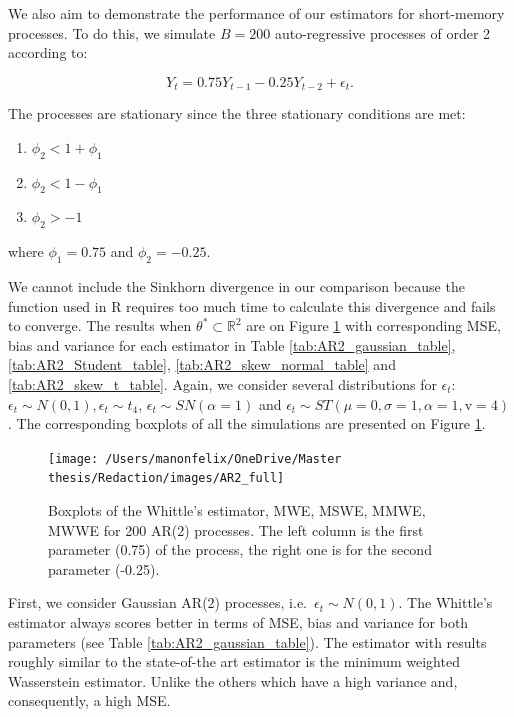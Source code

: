 \documentclass[
  11pt,
]{article}
\providecommand{\tightlist}{%
  \setlength{\itemsep}{0pt}\setlength{\parskip}{0pt}}
\begin{document}
We also aim to demonstrate the performance of our estimators for
short-memory processes. To do this, we simulate \(B = 200\)
auto-regressive processes of order 2 according to:

\[Y_t = 0.75 Y_{t-1} - 0.25Y_{t-2} + \epsilon_t.\]

The processes are stationary since the three stationary conditions are
met:

\begin{enumerate}
\def\labelenumi{\arabic{enumi}.}
\tightlist
\item
  \(\phi_{2}<1+\phi_{1}\)
\item
  \(\phi_{2}<1-\phi_{1}\)
\item
  \(\phi_{2}>-1\)
\end{enumerate}

where \(\phi_1 = 0.75\) and \(\phi_2 = -0.25\).

We cannot include the Sinkhorn divergence in our comparison because the
function used in R requires too much time to calculate this divergence
and fails to converge. The results when
\(\theta^* \subset \mathbb{R}^2\) are on Figure \ref{fig:ar2_full} with
corresponding MSE, bias and variance for each estimator in Table
\ref{tab:AR2_gaussian_table}, \ref{tab:AR2_Student_table},
\ref{tab:AR2_skew_normal_table} and \ref{tab:AR2_skew_t_table}. Again,
we consider several distributions for \(\epsilon_t\):
\(\epsilon_t \sim N(0,1), \epsilon_t \sim t_4\),
\(\epsilon_t \sim SN(\alpha = 1)\) and
\(\epsilon_t \sim S T(\mu = 0, \sigma = 1, \alpha = 1, \mathrm{v} = 4)\).
The corresponding boxplots of all the simulations are presented on
Figure \ref{fig:ar2_full}.

\begin{figure}

{\centering \texttt{[image: /Users/manonfelix/OneDrive/Master thesis/Redaction/images/AR2\_full]} 

}

\caption{Boxplots of the Whittle's estimator, MWE, MSWE, MMWE, MWWE for 200 AR(2) processes. The left column is the first parameter (0.75) of the process, the right one is for the second parameter (-0.25).}\label{fig:ar2_full}
\end{figure}

First, we consider Gaussian AR(\(2\)) processes,
i.e.~\(\epsilon_t \sim N(0,1)\). The Whittle's estimator always scores
better in terms of MSE, bias and variance for both parameters (see Table
\ref{tab:AR2_gaussian_table}). The estimator with results roughly
similar to the state-of-the art estimator is the minimum weighted
Wasserstein estimator. Unlike the others which have a high variance and,
consequently, a high MSE.
\end{document}

